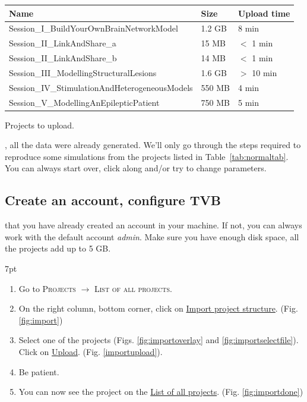 \documentclass{tufte-handout}
\newenvironment{formal}{%
  \def\FrameCommand{%
    \hspace{1pt}%
    {\color{DarkBlue}\vrule width 2pt}%
    {\color{formalshade}\vrule width 4pt}%
    \colorbox{formalshade}%
  }%
  \MakeFramed{\advance\hsize-\width\FrameRestore}%
  \noindent\hspace{-4.55pt}%
  \begin{adjustwidth}{}{7pt}%
  \vspace{2pt}\vspace{2pt}%
}
{%
  \vspace{2pt}\end{adjustwidth}\endMakeFramed%
}
\begin{document}
\begin{margintable}
  \centering
  \selectfont
  \begin{tabular}{lll}
    \toprule
    Name & Size & Upload time\\
    \midrule
    Session\_I\_BuildYourOwnBrainNetworkModel  & 1.2 GB & 8 min \\
    Session\_II\_LinkAndShare\_a & 15 MB &  $<$ 1 min \\
    Session\_II\_LinkAndShare\_b & 14 MB &  $<$ 1 min \\
    Session\_III\_ModellingStructuralLesions & 1.6 GB &  $>$ 10 min \\
    Session\_IV\_StimulationAndHeterogeneousModels & 550 MB &  4 min \\
    Session\_V\_ModellingAnEpilepticPatient & 750 MB & 5 min \\ 
    \bottomrule
  \end{tabular}
  \caption{Projects to upload.}
  \label{tab:normaltab}
\end{margintable}

, all the data were already generated. We'll only go through the steps required 
to reproduce some simulations from the projects listed in Table~\ref{tab:normaltab}. You can always start over, click along and/or try to change parameters.


\subsection{Create an account, configure TVB}

 that you have already created an account in your machine. 
If not, you can always work with the default account \textit{admin}. 
Make sure you have enough disk space, all the projects add up to 5 GB. 


\begin{formal}
\begin{enumerate}
\item Go to \textsc{Projects} $\rightarrow$ \textsc{List of all projects}.
\item On the right column, bottom corner, click on \underline{Import project structure}. (Fig. \ref{fig:import})
\item Select one of the projects (Figs. \ref{fig:importoverlay} and \ref{fig:importselectfile}).  Click on \underline{Upload}. (Fig. \ref{importupload}).
\item Be patient. 
\item You can now see the project on the \underline{List of all projects}. (Fig. \ref{fig:importdone})
\end{enumerate}
\end{formal}
\end{document}
